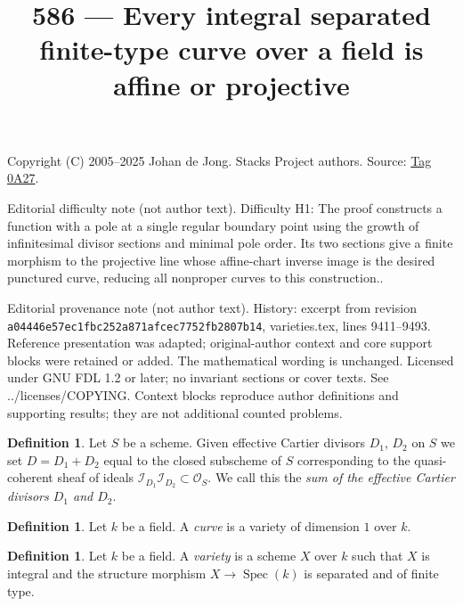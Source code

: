 \documentclass{amsart}
\theoremstyle{plain}
\theoremstyle{definition}
\newtheorem{definition}[subsection]{Definition}
\theoremstyle{remark}
\numberwithin{equation}{subsection}
\def\Spec{\mathop{\mathrm{Spec}}}
\begin{document}
\title[Stacks Project, Tag 0A27]{586 --- Every integral separated finite-type curve over a field is affine or projective}
\maketitle
\noindent Copyright (C) 2005--2025 Johan de Jong. Stacks Project authors. Source: \href{https://stacks.math.columbia.edu/tag/0A27}{Tag 0A27}.

\noindent Editorial difficulty note (not author text). Difficulty H1: The proof constructs a function with a pole at a single regular boundary point using the growth of infinitesimal divisor sections and minimal pole order. Its two sections give a finite morphism to the projective line whose affine-chart inverse image is the desired punctured curve, reducing all nonproper curves to this construction..

\noindent Editorial provenance note (not author text). History: excerpt from revision \texttt{a0444\allowbreak 6e57e\allowbreak c1fbc\allowbreak 252a8\allowbreak 71afc\allowbreak ec775\allowbreak 2fb28\allowbreak 07b14}, varieties.tex, lines 9411--9493. Reference presentation was adapted; original-author context and core support blocks were retained or added. The mathematical wording is unchanged. Licensed under GNU FDL 1.2 or later; no invariant sections or cover texts. See ../licenses/COPYING. Context blocks reproduce author definitions and supporting results; they are not additional counted problems.

\begin{definition}
\label{divisors-definition-sum-effective-Cartier-divisors}
Let $S$ be a scheme. Given effective Cartier divisors
$D_1$, $D_2$ on $S$ we set $D = D_1 + D_2$ equal to the
closed subscheme of $S$ corresponding to the quasi-coherent
sheaf of ideals
$\mathcal{I}_{D_1}\mathcal{I}_{D_2} \subset \mathcal{O}_S$.
We call this the {\it sum of the effective Cartier divisors
$D_1$ and $D_2$}.
\end{definition}

\begin{definition}
\label{definition-curve}
Let $k$ be a field. A {\it curve} is a variety of dimension $1$ over $k$.
\end{definition}

\begin{definition}
\label{definition-variety}
Let $k$ be a field. A {\it variety} is a scheme $X$ over $k$
such that $X$ is integral and the structure morphism
$X \to \Spec(k)$ is separated and of finite type.
\end{definition}
\end{document}
